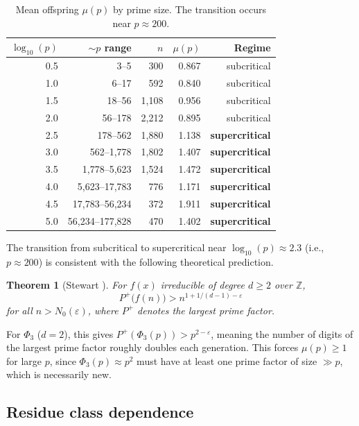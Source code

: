\documentclass[11pt]{article}
\newtheorem{theorem}{Theorem}
\theoremstyle{definition}
\theoremstyle{remark}
\newcommand{\Phi}{\varPhi}
\begin{document}
\begin{table}[H]
\centering
\begin{tabular}{@{}rrrrr@{}}
\toprule
$\log_{10}(p)$ & $\sim p$ range & $n$ & $\mu(p)$ & Regime \\
\midrule
0.5 & 3--5 & 300 & 0.867 & subcritical \\
1.0 & 6--17 & 592 & 0.840 & subcritical \\
1.5 & 18--56 & 1{,}108 & 0.956 & subcritical \\
2.0 & 56--178 & 2{,}212 & 0.895 & subcritical \\
2.5 & 178--562 & 1{,}880 & 1.138 & \textbf{supercritical} \\
3.0 & 562--1{,}778 & 1{,}802 & 1.407 & \textbf{supercritical} \\
3.5 & 1{,}778--5{,}623 & 1{,}524 & 1.472 & \textbf{supercritical} \\
4.0 & 5{,}623--17{,}783 & 776 & 1.171 & \textbf{supercritical} \\
4.5 & 17{,}783--56{,}234 & 372 & 1.911 & \textbf{supercritical} \\
5.0 & 56{,}234--177{,}828 & 470 & 1.402 & \textbf{supercritical} \\
\bottomrule
\end{tabular}
\caption{Mean offspring $\mu(p)$ by prime size. The transition occurs near $p \approx 200$.}
\label{tab:mu_bins}
\end{table}

The transition from subcritical to supercritical near $\log_{10}(p) \approx 2.3$ (i.e., $p \approx 200$) is consistent with the following theoretical prediction.

\begin{theorem}[Stewart {\cite{Stewart2013}}]\label{thm:stewart}
For $f(x)$ irreducible of degree $d \geq 2$ over $\mathbb{Z}$,
\[
P^+\bigl(f(n)\bigr) > n^{1 + 1/(d-1) - \varepsilon}
\]
for all $n > N_0(\varepsilon)$, where $P^+$ denotes the largest prime factor.
\end{theorem}

For $\Phi_3$ ($d = 2$), this gives $P^+(\Phi_3(p)) > p^{2-\varepsilon}$, meaning the number of digits of the largest prime factor roughly doubles each generation. This forces $\mu(p) \geq 1$ for large $p$, since $\Phi_3(p) \approx p^2$ must have at least one prime factor of size $\gg p$, which is necessarily new.

\subsection{Residue class dependence}
\end{document}
